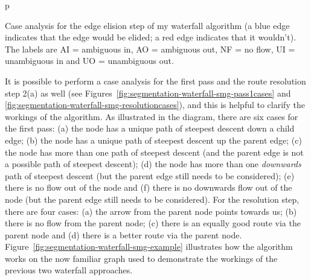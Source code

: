 \begin{stusubfig}{p}
	\hspace{4mm}
\caption[Case analysis for the edge elision step of my waterfall algorithm]{Case analysis for the edge elision step of my waterfall algorithm (a blue edge indicates that the edge would be elided; a red edge indicates that it wouldn't). The labels are AI = ambiguous in, AO = ambiguous out, NF = no flow, UI = unambiguous in and UO = unambiguous out.}
\label{fig:segmentation-waterfall-smg-mergecases}
\end{stusubfig}

\noindent It is possible to perform a case analysis for the first pass and the route resolution step 2(a) as well (see Figures~\ref{fig:segmentation-waterfall-smg-pass1cases} and \ref{fig:segmentation-waterfall-smg-resolutioncases}), and this is helpful to clarify the workings of the algorithm. As illustrated in the diagram, there are six cases for the first pass: (a) the node has a unique path of steepest descent down a child edge; (b) the node has a unique path of steepest descent up the parent edge; (c) the node has more than one path of steepest descent (and the parent edge is not a possible path of steepest descent); (d) the node has more than one \emph{downwards} path of steepest descent (but the parent edge still needs to be considered); (e) there is no flow out of the node and (f) there is no downwards flow out of the node (but the parent edge still needs to be considered). For the resolution step, there are four cases: (a) the arrow from the parent node points towards us; (b) there is no flow from the parent node; (c) there is an equally good route via the parent node and (d) there is a better route via the parent node. Figure~\ref{fig:segmentation-waterfall-smg-example} illustrates how the algorithm works on the now familiar graph used to demonstrate the workings of the previous two waterfall approaches.

